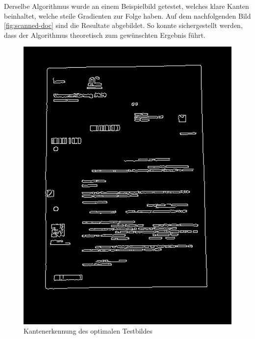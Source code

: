 Derselbe Algorithmus wurde an einem Beispielbild getestet, welches klare Kanten beinhaltet, welche steile Gradienten zur Folge haben. Auf dem nachfolgenden Bild \ref{fig:scanned-doc} sind die Resultate abgebildet. So konnte sichergestellt werden, dass der Algorithmus theoretisch zum gewünschten Ergebnis führt.

\begin{figure}[H]
  \centering
  \begin{minipage}[t]{0.32\linewidth}
  \includegraphics[width=1.0\textwidth]{img/piktogrammerkennung/edge_doc.jpg}
  \caption{Kantenerkennung des optimalen Testbildes}
  \label{fig:edge-doc}
  \end{minipage} 
  \hfill
  \begin{minipage}[t]{0.32\linewidth}

\end{minipage}
\end{figure}
